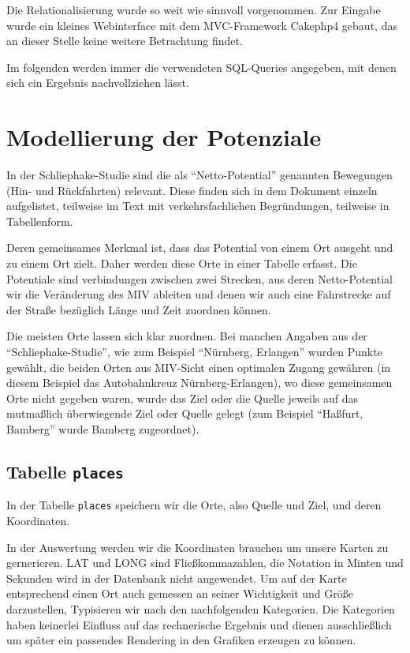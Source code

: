 \documentclass[fontsize=12pt,a4paper]{scrreprt}
\begin{document}
Die Relationalisierung wurde so weit wie sinnvoll vorgenommen. Zur Eingabe wurde ein kleines Webinterface mit dem MVC-Framework Cakephp4 gebaut, das an dieser Stelle keine weitere Betrachtung findet.

Im folgenden werden immer die verwendeten SQL-Queries angegeben, mit denen sich ein Ergebnis nachvollziehen lässt.

\section{Modellierung der Potenziale}
In der Schliephake-Studie sind die als \enquote{Netto-Potential} genannten Bewegungen (Hin- und Rückfahrten) relevant. Diese finden sich in dem Dokument einzeln aufgelistet, teilweise im Text mit verkehrsfachlichen Begründungen, teilweise in Tabellenform.

Deren gemeinsames Merkmal ist, dass das Potential von einem Ort ausgeht und zu einem Ort zielt. Daher werden diese Orte in einer Tabelle erfasst.
Die Potentiale sind verbindungen zwischen zwei Strecken, aus deren Netto-Potential wir die Veränderung des MIV ableiten und denen wir auch eine Fahrstrecke auf der Straße bezüglich Länge und Zeit zuordnen können.

Die meisten Orte lassen sich klar zuordnen. Bei manchen Angaben aus der \enquote{Schliephake-Studie}, wie zum Beispiel \enquote{Nürnberg, Erlangen} wurden Punkte gewählt, die beiden Orten aus MIV-Sicht einen optimalen Zugang gewähren (in diesem Beispiel das Autobahnkreuz Nürnberg-Erlangen), wo diese gemeinsamen Orte nicht gegeben waren, wurde das Ziel oder die Quelle jeweils auf das mutmaßlich überwiegende Ziel oder Quelle gelegt (zum Beispiel \enquote{Haßfurt, Bamberg} wurde Bamberg zugeordnet).

\subsection{Tabelle \texttt{places}}
In der Tabelle \texttt{places} speichern wir die Orte, also Quelle und Ziel, und deren Koordinaten.

In der Auswertung werden wir die Koordinaten brauchen um unsere Karten zu gernerieren. LAT und LONG sind Fließkommazahlen, die Notation in Minten und Sekunden wird in der Datenbank nicht angewendet.
Um auf der Karte entsprechend einen Ort auch gemessen an seiner Wichtigkeit und Größe darzustellen, Typisieren wir nach den nachfolgenden Kategorien.
Die Kategorien haben keinerlei Einfluss auf das rechnerische Ergebnis und dienen ausschließlich um später ein passendes Rendering in den Grafiken erzeugen zu können.
\end{document}
